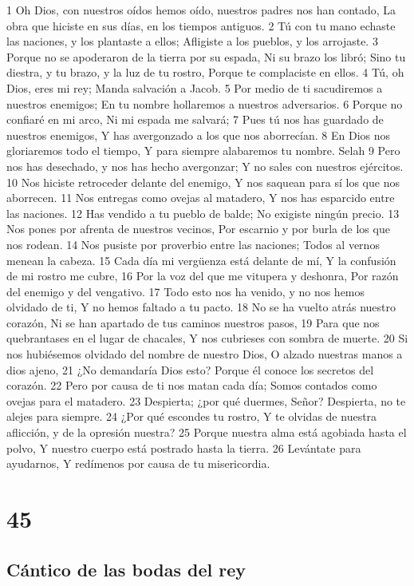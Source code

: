 1 Oh Dios, con nuestros oídos hemos oído, nuestros padres nos han contado,
La obra que hiciste en sus días, en los tiempos antiguos.
2 Tú con tu mano echaste las naciones, y los plantaste a ellos;
Afligiste a los pueblos, y los arrojaste.
3 Porque no se apoderaron de la tierra por su espada,
Ni su brazo los libró;
Sino tu diestra, y tu brazo, y la luz de tu rostro,
Porque te complaciste en ellos.
4 Tú, oh Dios, eres mi rey;
Manda salvación a Jacob.
5 Por medio de ti sacudiremos a nuestros enemigos;
En tu nombre hollaremos a nuestros adversarios.
6 Porque no confiaré en mi arco,
Ni mi espada me salvará;
7 Pues tú nos has guardado de nuestros enemigos,
Y has avergonzado a los que nos aborrecían.
8 En Dios nos gloriaremos todo el tiempo,
Y para siempre alabaremos tu nombre. Selah
9 Pero nos has desechado, y nos has hecho avergonzar;
Y no sales con nuestros ejércitos.
10 Nos hiciste retroceder delante del enemigo,
Y nos saquean para sí los que nos aborrecen.
11 Nos entregas como ovejas al matadero,
Y nos has esparcido entre las naciones.
12 Has vendido a tu pueblo de balde;
No exigiste ningún precio.
13 Nos pones por afrenta de nuestros vecinos,
Por escarnio y por burla de los que nos rodean.
14 Nos pusiste por proverbio entre las naciones;
Todos al vernos menean la cabeza.
15 Cada día mi vergüenza está delante de mí,
Y la confusión de mi rostro me cubre,
16 Por la voz del que me vitupera y deshonra,
Por razón del enemigo y del vengativo.
17 Todo esto nos ha venido, y no nos hemos olvidado de ti,
Y no hemos faltado a tu pacto.
18 No se ha vuelto atrás nuestro corazón,
Ni se han apartado de tus caminos nuestros pasos,
19 Para que nos quebrantases en el lugar de chacales,
Y nos cubrieses con sombra de muerte.
20 Si nos hubiésemos olvidado del nombre de nuestro Dios,
O alzado nuestras manos a dios ajeno,
21 ¿No demandaría Dios esto?
Porque él conoce los secretos del corazón.
22 Pero por causa de ti nos matan cada día;
Somos contados como ovejas para el matadero.
23 Despierta; ¿por qué duermes, Señor?
Despierta, no te alejes para siempre.
24 ¿Por qué escondes tu rostro,
Y te olvidas de nuestra aflicción, y de la opresión nuestra?
25 Porque nuestra alma está agobiada hasta el polvo,
Y nuestro cuerpo está postrado hasta la tierra.
26 Levántate para ayudarnos,
Y redímenos por causa de tu misericordia.

\chapter{45}

\section*{Cántico de las bodas del rey}

